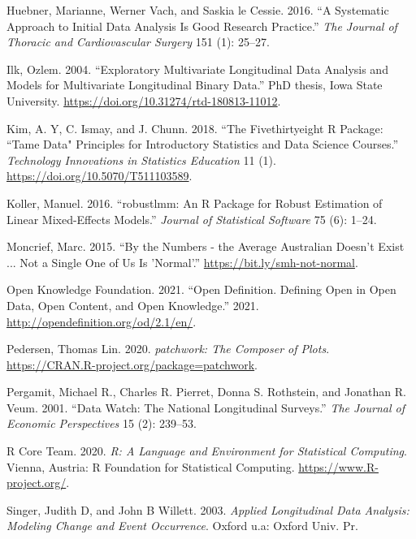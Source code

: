 \documentclass{article}
\begin{document}
\leavevmode\hypertarget{ref-HuebnerMariannePhD2016Asat}{}%
Huebner, Marianne, Werner Vach, and Saskia le Cessie. 2016. ``A Systematic Approach to Initial Data Analysis Is Good Research Practice.'' \emph{The Journal of Thoracic and Cardiovascular Surgery} 151 (1): 25--27.

\leavevmode\hypertarget{ref-ilk2004}{}%
Ilk, Ozlem. 2004. ``Exploratory Multivariate Longitudinal Data Analysis and Models for Multivariate Longitudinal Binary Data.'' PhD thesis, Iowa State University. \url{https://doi.org/10.31274/rtd-180813-11012}.

\leavevmode\hypertarget{ref-tamedata}{}%
Kim, A. Y, C. Ismay, and J. Chunn. 2018. ``The Fivethirtyeight R Package: ``Tame Data" Principles for Introductory Statistics and Data Science Courses.'' \emph{Technology Innovations in Statistics Education} 11 (1). \url{https://doi.org/10.5070/T511103589}.

\leavevmode\hypertarget{ref-KollerManuel2016rARP}{}%
Koller, Manuel. 2016. ``robustlmm: An R Package for Robust Estimation of Linear Mixed-Effects Models.'' \emph{Journal of Statistical Software} 75 (6): 1--24.

\leavevmode\hypertarget{ref-notaverage}{}%
Moncrief, Marc. 2015. ``By the Numbers - the Average Australian Doesn't Exist ... Not a Single One of Us Is 'Normal'.'' \url{https://bit.ly/smh-not-normal}.

\leavevmode\hypertarget{ref-opendata}{}%
Open Knowledge Foundation. 2021. ``Open Definition. Defining Open in Open Data, Open Content, and Open Knowledge.'' 2021. \url{http://opendefinition.org/od/2.1/en/}.

\leavevmode\hypertarget{ref-patchwork}{}%
Pedersen, Thomas Lin. 2020. \emph{patchwork: The Composer of Plots}. \url{https://CRAN.R-project.org/package=patchwork}.

\leavevmode\hypertarget{ref-MichaelRPergamit2001DWTN}{}%
Pergamit, Michael R., Charles R. Pierret, Donna S. Rothstein, and Jonathan R. Veum. 2001. ``Data Watch: The National Longitudinal Surveys.'' \emph{The Journal of Economic Perspectives} 15 (2): 239--53.

\leavevmode\hypertarget{ref-R}{}%
R Core Team. 2020. \emph{R: A Language and Environment for Statistical Computing}. Vienna, Austria: R Foundation for Statistical Computing. \url{https://www.R-project.org/}.

\leavevmode\hypertarget{ref-SingerJudithD2003Alda}{}%
Singer, Judith D, and John B Willett. 2003. \emph{Applied Longitudinal Data Analysis: Modeling Change and Event Occurrence}. Oxford u.a: Oxford Univ. Pr.
\end{document}
